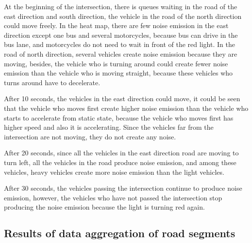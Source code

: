 \documentclass{article}
\begin{document}
\noindent At the beginning of the intersection, there is queues waiting in the road of the east direction and south direction, the vehicle in the road of the north  direction could move freely. In the heat map, there are few noise emission in the east direction except one bus and several motorcycles, because bus can drive in the bus lane, and motorcycles do not need to wait in front of the red light. In the road of north direction, several vehicles create noise emission because they are moving, besides, the vehicle who is turning around could create fewer noise emission than the vehicle who is moving straight, because these vehicles who turns around have to decelerate.

\noindent After 10 seconds, the vehicles in the east direction could move, it could be seen that the vehicle who moves first create higher noise emission than the vehicle who starts to accelerate from static state, because the vehicle who moves first has higher speed and also it is accelerating. Since the vehicles far from the intersection are not moving, they do not create any noise.

\noindent After 20 seconds, since all the vehicles in the east direction road are moving to turn left, all the vehicles in the road produce noise emission, and among these vehicles, heavy vehicles create more noise emission than the light vehicles. 

\noindent After 30 seconds, the vehicles passing the intersection continue to produce noise emission, however, the vehicles who have not passed the intersection stop producing the noise emission because the light is turning red again.
{\color{red} \subsection{Results of data aggregation of road segments}}
\end{document}
